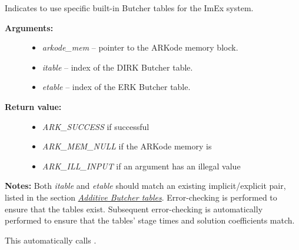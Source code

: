 \documentclass[letterpaper,10pt,english]{sphinxmanual}
\begin{document}
\begin{fulllineitems}
\label{c_interface/User_callable:ARKodeSetARKTableNum}
Indicates to use specific built-in Butcher tables for the ImEx system.
\begin{description}
\item[{\textbf{Arguments:}}] \leavevmode\begin{itemize}
\item {} 
\emph{arkode\_mem} -- pointer to the ARKode memory block.

\item {} 
\emph{itable} -- index of the DIRK Butcher table.

\item {} 
\emph{etable} -- index of the ERK Butcher table.

\end{itemize}

\item[{\textbf{Return value:}}] \leavevmode\begin{itemize}
\item {} 
\emph{ARK\_SUCCESS} if successful

\item {} 
\emph{ARK\_MEM\_NULL} if the ARKode memory is 

\item {} 
\emph{ARK\_ILL\_INPUT} if an argument has an illegal value

\end{itemize}

\end{description}

\textbf{Notes:} Both \emph{itable} and \emph{etable} should match an existing
implicit/explicit pair, listed in the section {\hyperref[Butcher:butcher-additive]{\emph{Additive Butcher tables}}}.
Error-checking is performed to ensure that the tables exist.
Subsequent error-checking is automatically performed to ensure that
the tables' stage times and solution coefficients match.

This automatically calls {\hyperref[c_interface/User_callable:ARKodeSetImEx]{}}.

\end{fulllineitems}

\end{document}
